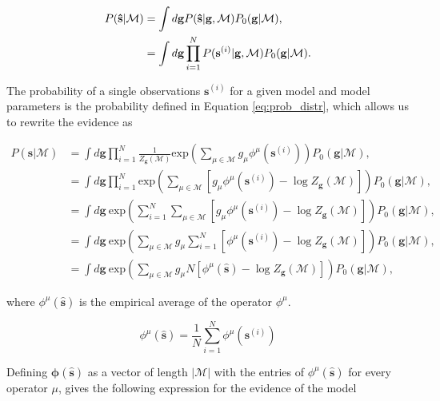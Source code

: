 \begin{align}
    P(\mathbf{\hat{s}}|\mathcal{M}) &= \int d\mathbf{g} P(\mathbf{\hat{s}} | \mathbf{g}, \mathcal{M}) P_0(\mathbf{g}|\mathcal{M}), \\
    &= \int d\mathbf{g} \prod_{i=1}^N P(\mathbf{s}^{(i)} | \mathbf{g}, \mathcal{M}) P_0(\mathbf{g}|\mathcal{M}). \notag
\end{align}

\noindent
The probability of a single observations $\mathbf{s}^{(i)}$ for a given model and model parameters is the probability defined in Equation \ref{eq:prob_distr}, which allows us to rewrite the evidence as

\begin{align*}
    P(\mathbf{\hat{s}}|\mathcal{M}) &= \int d\mathbf{g} \prod_{i=1}^N \frac{1}{Z_\mathbf{g}(\mathcal{M})} \text{exp}\left(\sum_{\mu \in \mathcal{M}} g_\mu \phi^\mu(\mathbf{s}^{(i)}) \right) P_0(\mathbf{g}|\mathcal{M}), \\
    &= \int d\mathbf{g} \prod_{i=1}^N \text{exp}\left(\sum_{\mu \in \mathcal{M}} \left[ g_\mu \phi^\mu(\mathbf{s}^{(i)}) - \log {Z_\mathbf{g}(\mathcal{M})} \right] \right) P_0(\mathbf{g}|\mathcal{M}), \\
    &= \int d\mathbf{g} \: \text{exp}\left(\sum_{i=1}^N \sum_{\mu \in \mathcal{M}} \left[ g_\mu \phi^\mu(\mathbf{s}^{(i)}) - \log {Z_\mathbf{g}(\mathcal{M})} \right] \right) P_0(\mathbf{g}|\mathcal{M}), \\
    &= \int d\mathbf{g} \: \text{exp}\left(\sum_{\mu \in \mathcal{M}} g_\mu \sum_{i=1}^N \left[ \phi^\mu(\mathbf{s}^{(i)}) - \log {Z_\mathbf{g}(\mathcal{M})} \right] \right) P_0(\mathbf{g}|\mathcal{M}), \\
    &= \int d\mathbf{g} \: \text{exp}\left(\sum_{\mu \in \mathcal{M}} g_\mu N \left[ \phi^\mu(\mathbf{\hat{s}}) - \log {Z_\mathbf{g}(\mathcal{M})} \right] \right) P_0(\mathbf{g}|\mathcal{M}),
\end{align*}

\noindent
where $\phi^\mu(\mathbf{\hat{s}})$ is the empirical average of the operator $\phi^\mu$.

\begin{equation}
    \phi^\mu(\mathbf{\hat{s}}) = \frac{1}{N} \sum_{i=1}^N \phi^\mu(\mathbf{s}^{(i)})
\end{equation}

\noindent
Defining $\boldsymbol{\phi}(\mathbf{\hat{s}})$ as a vector of length $|\mathcal{M}|$ with the entries of $\phi^\mu(\mathbf{\hat{s}})$ for every operator $\mu$, gives the following expression for the evidence of the model

